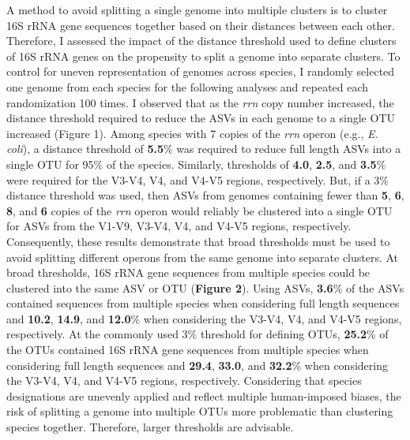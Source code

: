 \documentclass[
]{article}
\begin{document}
A method to avoid splitting a single genome into multiple clusters is to
cluster 16S rRNA gene sequences together based on their distances
between each other. Therefore, I assessed the impact of the distance
threshold used to define clusters of 16S rRNA genes on the propensity to
split a genome into separate clusters. To control for uneven
representation of genomes across species, I randomly selected one genome
from each species for the following analyses and repeated each
randomization 100 times. I observed that as the \emph{rrn} copy number
increased, the distance threshold required to reduce the ASVs in each
genome to a single OTU increased (Figure 1). Among species with 7 copies
of the \emph{rrn} operon (e.g., \emph{E. coli}), a distance threshold of
\textbf{5.5}\% was required to reduce full length ASVs into a single OTU
for 95\% of the species. Similarly, thresholds of \textbf{4.0},
\textbf{2.5}, and \textbf{3.5}\% were required for the V3-V4, V4, and
V4-V5 regions, respectively. But, if a 3\% distance threshold was used,
then ASVs from genomes containing fewer than \textbf{5}, \textbf{6},
\textbf{8}, and \textbf{6} copies of the \emph{rrn} operon would
reliably be clustered into a single OTU for ASVs from the V1-V9, V3-V4,
V4, and V4-V5 regions, respectively. Consequently, these results
demonstrate that broad thresholds must be used to avoid splitting
different operons from the same genome into separate clusters. At broad
thresholds, 16S rRNA gene sequences from multiple species could be
clustered into the same ASV or OTU (\textbf{Figure 2}). Using ASVs,
\textbf{3.6}\% of the ASVs contained sequences from multiple species
when considering full length sequences and \textbf{10.2}, \textbf{14.9},
and \textbf{12.0}\% when considering the V3-V4, V4, and V4-V5 regions,
respectively. At the commonly used 3\% threshold for defining OTUs,
\textbf{25.2}\% of the OTUs contained 16S rRNA gene sequences from
multiple species when considering full length sequences and
\textbf{29.4}, \textbf{33.0}, and \textbf{32.2}\% when considering the
V3-V4, V4, and V4-V5 regions, respectively. Considering that species
designations are unevenly applied and reflect multiple human-imposed
biases, the risk of splitting a genome into multiple OTUs more
problematic than clustering species together. Therefore, larger
thresholds are advisable.
\end{document}
